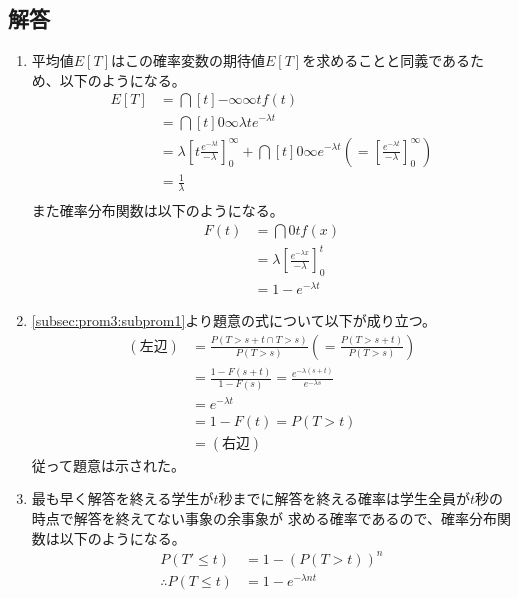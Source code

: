\documentclass[dvipdfmx,titlepage, 11pt, a4paper]{jsarticle}%
\begin{document}
\subsection{解答}
\begin{enumerate}[(1)]
    \item 平均値$E[T]$はこの確率変数の期待値$E[T]$を求めることと同義であるため、以下のようになる。
        \begin{align*}
            E[T] 
            &= \dint[t]{-\infty}{\infty}{tf(t)}\\
            &= \dint[t]{0}{\infty}{\lambda te^{-\lambda t}}\\
            &= \lambda\left[t\frac{e^{-\lambda t}}{-\lambda}\right]_{0}^{\infty} + \dint[t]{0}{\infty}{e^{-\lambda t}}
            \left(= \left[\frac{e^{-\lambda t}}{-\lambda}\right]_{0}^{\infty}\right)\\
            &= \frac{1}{\lambda}\\
        \end{align*}
        また確率分布関数は以下のようになる。
        \begin{align*}
            F(t) 
            &= \dint{0}{t}{f(x)}\\
            &= \lambda\left[\frac{e^{-\lambda x}}{-\lambda}\right]_{0}^{t}\\
            &= 1 - e^{-\lambda t}
        \end{align*}
    \item \eqref{subsec:prom3:subprom1}より題意の式について以下が成り立つ。
        \begin{align*}
            (左辺) 
            &= \frac{P(T > s + t \cap T > s)}{P(T > s)} \left(= \frac{P(T > s + t)}{P(T > s)}\right)\\
            &= \frac{1 - F(s + t)}{1 - F(s)}
            = \frac{e^{\displaystyle -\lambda(s + t)}}{e^{\displaystyle -\lambda s}}\\
            &= e^{-\lambda t}\\
            &= 1 - F(t) = P(T > t)\\
            &= (右辺)
        \end{align*}
        従って題意は示された。
    \item 最も早く解答を終える学生が$t$秒までに解答を終える確率は学生全員が$t$秒の時点で解答を終えてない事象の余事象が
    求める確率であるので、確率分布関数は以下のようになる。
        \begin{align*}
            P(T' \leq t) &= 1 - (P(T > t))^{n}\\
            \therefore P(T \leq t) &= 1 - e^{- \lambda n t}

\end{align*}
\end{enumerate}
\end{document}
